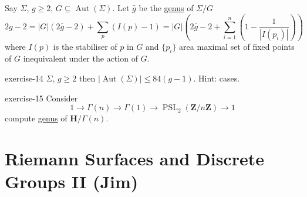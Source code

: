 \documentclass[10pt,]{book}
\numberwithin{equation}{section}
\newcommand{\ZZ}{\mathbf{Z}}
\newcommand{\HH}{\mathbf{H}}
\DeclareMathOperator{\Aut}{Aut}
\DeclareMathOperator{\PSL}{PSL}
\begin{document}
\hypertarget{p-570}{}%
Say \(\Sigma\), \(g\ge 2\), \(G\subseteq \Aut(\Sigma)\). Let \(\bar g\) be the \hyperref[fact-existance-genus]{genus} of \(\Sigma /G\)%
\begin{equation*}
2g - 2 = |G| (2\bar g - 2) + \sum_p (I(p) - 1) = |G|(2\bar g - 2 + \sum_{i=1}^n (1 - \frac{1}{|I(p_i)|}))
\end{equation*}
where \(I(p)\) is the stabiliser of \(p\) in \(G\) and \(\{p_i\}\) area maximal set of fixed points of \(G\) inequivalent under the action of \(G\).%
\begin{inlineexercise}{}{exercise-14}%
\hypertarget{p-571}{}%
\(\Sigma,\,g\ge 2\) then \(|\Aut(\Sigma)| \le 84(g-1)\). Hint: cases.%
\end{inlineexercise}
\begin{inlineexercise}{}{exercise-15}%
\hypertarget{p-572}{}%
Consider%
\begin{equation*}
1 \to \Gamma(n) \to \Gamma(1) \to \PSL_2(\ZZ/n\ZZ) \to 1
\end{equation*}
compute \hyperref[fact-existance-genus]{genus} of \(\HH/\Gamma(n)\).%
\end{inlineexercise}
%
%
\typeout{************************************************}
\typeout{************************************************}
%
\section[{Riemann Surfaces and Discrete Groups II (Jim)}]{Riemann Surfaces and Discrete Groups II (Jim)}\label{sec-rs-discrete-groups-ii}
%
%
\typeout{************************************************}
\typeout{************************************************}
%
\end{document}
